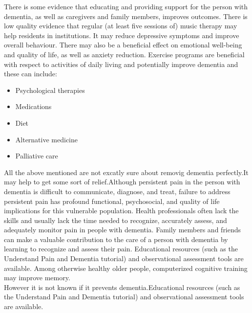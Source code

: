 There is some evidence that educating and providing support for the person with dementia, as well as caregivers and family members, improves outcomes. There is low quality evidence that regular (at least five sessions of) music therapy may help residents in institutions. It may reduce depressive symptoms and improve overall behaviour. There may also be a beneficial effect on emotional well-being and quality of life, as well as anxiety reduction. Exercise programs are beneficial with respect to activities of daily living and potentially improve dementia and these can include:
\begin{itemize}
  \item Psychological therapies
  \item Medications
\item Diet
\item Alternative medicine
\item Palliative care
\end{itemize}
All the above mentioned are not excatly sure about removig dementia perfectly.It may help to get some sort of relief.Although persistent pain in the person with dementia is difficult to communicate, diagnose, and treat, failure to address persistent pain has profound functional, psychosocial, and quality of life implications for this vulnerable population. Health professionals often lack the skills and usually lack the time needed to recognize, accurately assess, and adequately monitor pain in people with dementia. Family members and friends can make a valuable contribution to the care of a person with dementia by learning to recognize and assess their pain. Educational resources (such as the Understand Pain and Dementia tutorial) and observational assessment tools are available.
Among otherwise healthy older people, computerized cognitive training may improve memory.\\ However it is not known if it prevents dementia.Educational resources (such as the Understand Pain and Dementia tutorial) and observational assessment tools are available.\\

